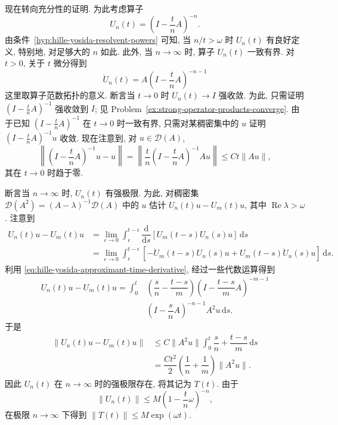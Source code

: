 现在转向充分性的证明. 为此考虑算子
\begin{equation}\label{eq:hille-yosida-implicit-resolvent-power-approximant}
U_n(t)=\left(I-\dfrac{t}{n}A\right)^{-n}.
\end{equation}
由条件~\ref{hyp:hille-yosida-resolvent-powers} 可知, 当 $n/t>\omega$ 时 $U_n(t)$ 有良好定义, 特别地, 对足够大的 $n$ 如此. 此外, 当 $n\to\infty$ 时, 算子 $U_n(t)$ 一致有界. 对 $t>0$, 关于 $t$ 微分得到
\begin{equation}\label{eq:hille-yosida-approximant-time-derivative}
\dot U_n(t)=A\left(I-\dfrac{t}{n}A\right)^{-n-1}
\end{equation}
这里取算子范数拓扑的意义. 断言当 $t\to0$ 时 $U_n(t)\to I$ 强收敛. 为此, 只需证明 $(I-\frac{t}{n}A)^{-1}$ 强收敛到 $I$; 见 Problem~\ref{ex:strong-operator-products-converge}. 由于已知 $(I-\frac{t}{n}A)^{-1}$ 在 $t\to0$ 时一致有界, 只需对某稠密集中的 $u$ 证明 $(I-\frac{t}{n}A)^{-1}u$ 收敛. 现在注意到, 对 $u\in\mathcal{D}(A)$,
\begin{equation}\label{eq:hille-yosida-resolvent-initial-strong-limit-bound}
\left\|\left(I-\dfrac{t}{n}A\right)^{-1}u-u\right\|=\left\|\dfrac{t}{n}\left(I-\dfrac{t}{n}A\right)^{-1}Au\right\|\leq Ct\|Au\|,
\end{equation}
其在 $t\to0$ 时趋于零.

断言当 $n\to\infty$ 时, $U_n(t)$ 有强极限. 为此, 对稠密集 $\mathcal{D}(A^2)=(A-\lambda)^{-1}\mathcal{D}(A)$ 中的 $u$ 估计 $U_n(t)u-U_m(t)u$, 其中 $\operatorname{Re}\lambda>\omega$. 注意到\[\begin{aligned}
U_n(t)u-U_m(t)u&=\lim_{\epsilon\to0}\int_\epsilon^{t-\epsilon}\dfrac{\mathrm{d}}{\mathrm{d}s}[U_m(t-s)U_n(s)u]\,\mathrm{d}s\\
&=\lim_{\epsilon\to0}\int_\epsilon^{t-\epsilon}[-\dot U_m(t-s)U_n(s)u+U_m(t-s)\dot U_n(s)u]\,\mathrm{d}s.
\end{aligned}\]利用 \eqref{eq:hille-yosida-approximant-time-derivative}, 经过一些代数运算得到
\begin{equation}\label{eq:hille-yosida-two-approximants-difference-integral}
\begin{aligned}U_n(t)u-U_m(t)u=\int_0^t&\left(\dfrac{s}{n}-\dfrac{t-s}{m}\right)\left(I-\dfrac{t-s}{m}A\right)^{-m-1}\\&\left(I-\dfrac{s}{n}A\right)^{-n-1}A^2u\,\mathrm{d}s.\end{aligned}
\end{equation}
于是
\begin{equation}\label{eq:hille-yosida-approximants-cauchy-bound}
\begin{aligned}\|U_n(t)u-U_m(t)u\|&\leq C\|A^2u\|\int_0^t\dfrac{s}{n}+\dfrac{t-s}{m}\,\mathrm{d}s\\&=\dfrac{Ct^2}{2}\left(\dfrac{1}{n}+\dfrac{1}{m}\right)\|A^2u\|.\end{aligned}
\end{equation}
因此 $U_n(t)$ 在 $n\to\infty$ 时的强极限存在, 将其记为 $T(t)$. 由于
\begin{equation}\label{eq:hille-yosida-approximant-exponential-growth-bound}
\|U_n(t)\|\leq M\left(1-\dfrac{t}{n}\omega\right)^{-n},
\end{equation}
在极限 $n\to\infty$ 下得到 $\|T(t)\|\leq M\exp(\omega t)$.


